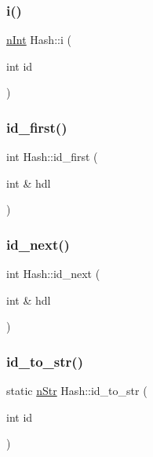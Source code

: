 \subsubsection{\texorpdfstring{i()}{i()}\hspace{0.1cm}{\footnotesize\ttfamily [2/2]}}
{\footnotesize\ttfamily \mbox{\hyperlink{Node_8h_a17693eab3c96e5b590641f884a5a6ff1}{n\+Int}} Hash\+::i (\begin{DoxyParamCaption}\item[{int}]{id }\end{DoxyParamCaption})}

\mbox{\label{classHash_aa44116e6a086026ef24ddd2c15c9f83a}} 
\subsubsection{\texorpdfstring{id\+\_\+first()}{id\_first()}}
{\footnotesize\ttfamily int Hash\+::id\+\_\+first (\begin{DoxyParamCaption}\item[{int \&}]{hdl }\end{DoxyParamCaption})}

\mbox{\label{classHash_a24f1be32cbdf92d9a4367bd006a04121}} 
\subsubsection{\texorpdfstring{id\+\_\+next()}{id\_next()}}
{\footnotesize\ttfamily int Hash\+::id\+\_\+next (\begin{DoxyParamCaption}\item[{int \&}]{hdl }\end{DoxyParamCaption})}

\mbox{\label{classHash_a7714f30421720c111bfee3c6773cf414}} 
\subsubsection{\texorpdfstring{id\+\_\+to\+\_\+str()}{id\_to\_str()}}
{\footnotesize\ttfamily static \mbox{\hyperlink{Node_8h_a0d7591b97fcccd83c3c2ce469c8bc25c}{n\+Str}} Hash\+::id\+\_\+to\+\_\+str (\begin{DoxyParamCaption}\item[{int}]{id }\end{DoxyParamCaption})\hspace{0.3cm}{\ttfamily [static]}}


